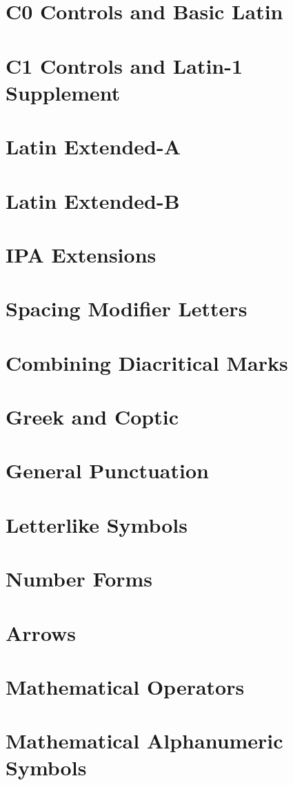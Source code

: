 \documentclass{article}
\begin{document}
\section{C0 Controls and Basic Latin}

\section{C1 Controls and Latin-1 Supplement}

\section{Latin Extended-A}

\section{Latin Extended-B}

\section{IPA Extensions}

\section{Spacing Modifier Letters}

\section{Combining Diacritical Marks}

\section{Greek and Coptic}

\section{General Punctuation}

\section{Letterlike Symbols}

\section{Number Forms}

\section{Arrows}

\section{Mathematical Operators}

\section{Mathematical Alphanumeric Symbols}
\end{document}
